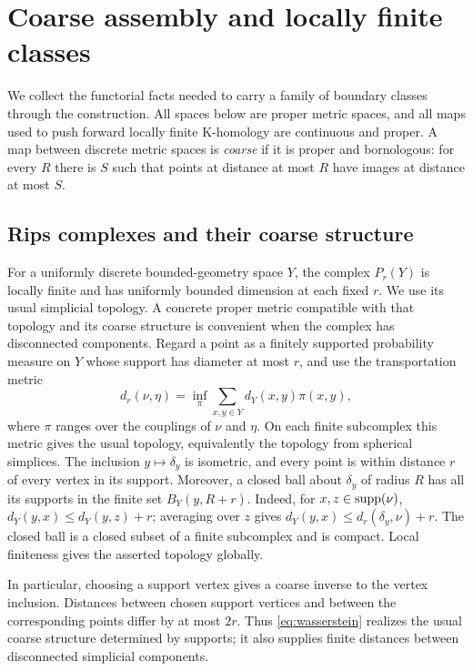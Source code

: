 \section{Coarse assembly and locally finite classes}\label{sec:conventions}

We collect the functorial facts needed to carry a family of boundary classes
through the construction. All spaces below are proper metric spaces, and all
maps used to push forward locally finite K-homology are continuous and proper.
A map between discrete metric spaces is \emph{coarse} if it is proper and
bornologous: for every $R$ there is $S$ such that points at distance at most
$R$ have images at distance at most $S$.

\subsection{Rips complexes and their coarse structure}
For a uniformly discrete bounded-geometry space $Y$, the complex $P_r(Y)$ is
locally finite and has uniformly bounded dimension at each fixed $r$.
We use its usual simplicial topology. A concrete proper metric compatible
with that topology and its coarse structure is convenient when the complex
has disconnected components. Regard a point as a finitely supported
probability measure on $Y$ whose support has diameter at most $r$, and use
the transportation metric
\begin{equation}\label{eq:wasserstein}
 d_r(\nu,\eta)=\inf_{\pi}\sum_{x,y\in Y}d_Y(x,y)\pi(x,y),
\end{equation}
where $\pi$ ranges over the couplings of $\nu$ and $\eta$.
On each finite subcomplex this metric gives the usual topology, equivalently
the topology from spherical simplices. The inclusion $y\mapsto\delta_y$ is
isometric, and every point is within distance $r$ of every vertex in its
support. Moreover, a closed ball about $\delta_y$ of radius $R$ has all its supports
in the finite set $B_Y(y,R+r)$. Indeed, for $x,z\in\operatorname{supp}(\nu)$,
$d_Y(y,x)\le d_Y(y,z)+r$; averaging over $z$ gives
$d_Y(y,x)\le d_r(\delta_y,\nu)+r$. The closed ball is a closed subset
of a finite subcomplex and is compact. Local finiteness gives the asserted
topology globally.

In particular, choosing a support vertex gives a coarse inverse to the
vertex inclusion. Distances between chosen support vertices and between
the corresponding points differ by at most $2r$. Thus
\eqref{eq:wasserstein} realizes the usual coarse structure determined by
supports; it also supplies finite distances between disconnected simplicial
components.

